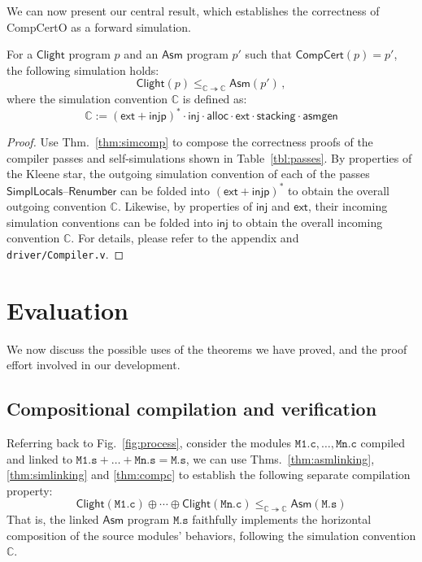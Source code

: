 \documentclass[acmsmall,authordraft]{acmart}
\newcommand{\kw}[1]{\ensuremath{ \mathsf{#1} }}
\begin{document}
We can now present our central result,
which establishes the correctness of CompCertO
as a forward simulation.

\begin{theorem} \label{thm:compc} %
For a \kw{Clight} program $p$
and an \kw{Asm} program $p'$ such that
$\kw{CompCert}(p) = p'$,
the following simulation holds:
\[
    \kw{Clight}(p) \le_{\mathbb{C} \twoheadrightarrow \mathbb{C}}
    \kw{Asm}(p') \,,
\]
where the simulation convention $\mathbb{C}$ is defined as:
\[
    \mathbb{C} := (\kw{ext} + \kw{injp})^* \cdot \kw{inj} \cdot
      \kw{alloc} \cdot
      \kw{ext} \cdot %
      \kw{stacking} \cdot
      \kw{asmgen}
\]
\begin{proof}
Use Thm.~\ref{thm:simcomp} to compose
the correctness proofs of the compiler passes and
self-simulations shown in Table~\ref{tbl:passes}.
By properties of the Kleene star,
the outgoing simulation convention of each of the
passes \kw{SimplLocals}--\kw{Renumber} %
can be folded into $(\kw{ext} + \kw{injp})^*$
to obtain the overall outgoing convention $\mathbb{C}$.
Likewise, by properties of $\kw{inj}$ and $\kw{ext}$,
their incoming simulation conventions
can be folded into $\kw{inj}$
to obtain the overall incoming convention $\mathbb{C}$.
For details, please refer to the appendix
and \texttt{driver/Compiler.v}.
\end{proof}
\end{theorem}



\section{Evaluation} \label{sec:eval} %

We now discuss the possible uses of the theorems we have proved,
and the proof effort involved in our development.

\subsection{Compositional compilation and verification} \label{sec:cver} %

Referring back to Fig.~\ref{fig:process},
consider the modules
$\mathtt{M1.c}, \ldots, \mathtt{Mn.c}$
compiled and linked to
$\mathtt{M1.s} + \ldots + \mathtt{Mn.s} = \mathtt{M.s}$,
we can use
Thms.~\ref{thm:asmlinking},
\ref{thm:simlinking} and
\ref{thm:compc}
to establish the following separate compilation property:
\begin{equation}
  \label{eqn:sepcomp}
  \kw{Clight}(\mathtt{M1.c}) \oplus \cdots \oplus \kw{Clight}(\mathtt{Mn.c})
  \le_{\mathbb{C} \twoheadrightarrow \mathbb{C}}
  \kw{Asm}(\mathtt{M.s})
\end{equation}
That is,
the linked \kw{Asm} program
$\mathtt{M.s}$
faithfully implements
the horizontal composition of the source modules' behaviors,
following the simulation convention $\mathbb{C}$.
\end{document}
